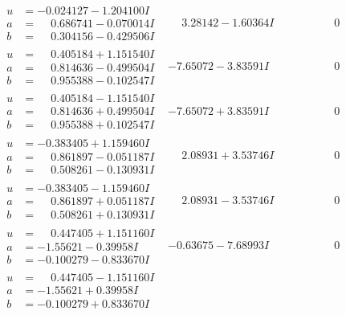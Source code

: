 \documentclass[1p]{elsarticle_modified}
\theoremstyle{definition}
\begin{document}
$$\begin{array}{c|c|c}
\begin{aligned}
u &= -0.024127 - 1.204100 I \\
a &= \phantom{-}0.686741 - 0.070014 I \\
b &= \phantom{-}0.304156 - 0.429506 I\end{aligned}
 & \phantom{-}3.28142 - 1.60364 I & \phantom{-0.000000 } 0 \\ \hline\begin{aligned}
u &= \phantom{-}0.405184 + 1.151540 I \\
a &= \phantom{-}0.814636 - 0.499504 I \\
b &= \phantom{-}0.955388 - 0.102547 I\end{aligned}
 & -7.65072 - 3.83591 I & \phantom{-0.000000 } 0 \\ \hline\begin{aligned}
u &= \phantom{-}0.405184 - 1.151540 I \\
a &= \phantom{-}0.814636 + 0.499504 I \\
b &= \phantom{-}0.955388 + 0.102547 I\end{aligned}
 & -7.65072 + 3.83591 I & \phantom{-0.000000 } 0 \\ \hline\begin{aligned}
u &= -0.383405 + 1.159460 I \\
a &= \phantom{-}0.861897 - 0.051187 I \\
b &= \phantom{-}0.508261 - 0.130931 I\end{aligned}
 & \phantom{-}2.08931 + 3.53746 I & \phantom{-0.000000 } 0 \\ \hline\begin{aligned}
u &= -0.383405 - 1.159460 I \\
a &= \phantom{-}0.861897 + 0.051187 I \\
b &= \phantom{-}0.508261 + 0.130931 I\end{aligned}
 & \phantom{-}2.08931 - 3.53746 I & \phantom{-0.000000 } 0 \\ \hline\begin{aligned}
u &= \phantom{-}0.447405 + 1.151160 I \\
a &= -1.55621 - 0.39958 I \\
b &= -0.100279 - 0.833670 I\end{aligned}
 & -0.63675 - 7.68993 I & \phantom{-0.000000 } 0 \\ \hline\begin{aligned}
u &= \phantom{-}0.447405 - 1.151160 I \\
a &= -1.55621 + 0.39958 I \\
b &= -0.100279 + 0.833670 I\end{aligned}

\end{array}$$
\end{document}
